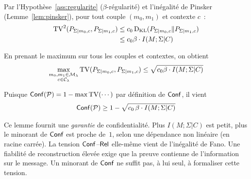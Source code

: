 \begin{sloppypar}
\begin{Preuve}
Par l'Hypoth\`ese~\ref{ass:regularite} ($\beta$-r\'egularit\'e) et l'in\'egalit\'e de
Pinsker (Lemme~\ref{lem:pinsker}), pour tout couple $(m_0, m_1)$ et
contexte $c$~:
\begin{align}
\operatorname{TV}^2(P_{\Sigma|m_0,c}, P_{\Sigma|m_1,c})
&\leq c_0 \operatorname{D_{\text{KL}}}(P_{\Sigma|m_0,c} \| P_{\Sigma|m_1,c})
\\
&\leq c_0 \beta \cdot I(M;\Sigma|C)
\end{align}

En prenant le maximum sur tous les couples et contextes, on obtient
\begin{equation}
\max_{\substack{m_0, m_1 \in \mathcal{M}_\lambda \\ c \in \mathcal{C}_\lambda}}
\operatorname{TV}(P_{\Sigma|m_0,c}, P_{\Sigma|m_1,c})
\leq \sqrt{c_0\beta \cdot I(M;\Sigma|C)}
\end{equation}

Puisque $\mathsf{Conf}(\mathcal{P}) = 1 - \max \operatorname{TV}(\cdots)$ par d\'efinition
de $\mathsf{Conf}$, il vient
\begin{equation}
\mathsf{Conf}(\mathcal{P}) \geq 1 - \sqrt{c_0\,\beta \cdot I(M;\Sigma|C)}
\end{equation}
\end{Preuve}

\begin{remark}\label{rem:interpretation_lemme}
Ce lemme fournit une \emph{garantie} de confidentialit\'e. Plus
$I(M;\Sigma|C)$ est petit, plus le minorant de $\mathsf{Conf}$ est proche de~$1$,
selon une d\'ependance non lin\'eaire (en racine carr\'ee). La tension
$\mathsf{Conf}$--$\mathsf{Rel}$ elle-m\^eme vient de l'in\'egalit\'e de Fano. Une fiabilit\'e
de reconstruction \'elev\'ee exige que la preuve contienne de l'information
sur le message. Un minorant de $\mathsf{Conf}$ ne suffit pas, \`a lui seul, \`a
formaliser cette tension.
\end{remark}


\end{sloppypar}
